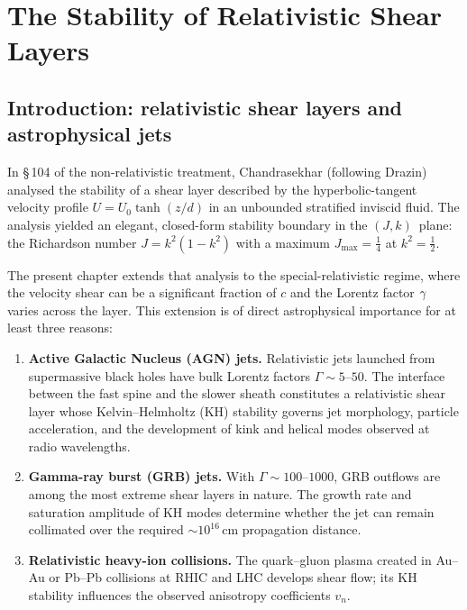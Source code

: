 
\chapter{The Stability of Relativistic Shear Layers}
\label{ch:rel-11-104}

\section{Introduction: relativistic shear layers and astrophysical jets}
\label{sec:rel-11-104-intro}

In \S\,104 of the non-relativistic treatment, Chandrasekhar (following
Drazin) analysed the stability of a shear layer described by the
hyperbolic-tangent velocity profile $U=U_0\tanh(z/d)$ in an unbounded
stratified inviscid fluid.  The analysis yielded an elegant, closed-form
stability boundary in the $(J,k)$~plane: the Richardson number
$J=k^2(1-k^2)$ with a maximum $J_{\max}=\tfrac{1}{4}$ at $k^2=\tfrac{1}{2}$.

The present chapter extends that analysis to the special-relativistic
regime, where the velocity shear can be a significant fraction of $c$ and
the Lorentz factor $\gamma$ varies across the layer.  This extension is of
direct astrophysical importance for at least three reasons:
\begin{enumerate}
\item \textbf{Active Galactic Nucleus (AGN) jets.}  Relativistic jets
  launched from supermassive black holes have bulk Lorentz factors
  $\Gamma\sim 5$--$50$.  The interface between the fast spine and the
  slower sheath constitutes a relativistic shear layer whose
  Kelvin--Helmholtz (KH) stability governs jet morphology, particle
  acceleration, and the development of kink and helical modes observed
  at radio wavelengths.
\item \textbf{Gamma-ray burst (GRB) jets.}  With $\Gamma\sim 100$--$1000$,
  GRB outflows are among the most extreme shear layers in nature.  The
  growth rate and saturation amplitude of KH modes determine whether
  the jet can remain collimated over the required $\sim 10^{16}\,$cm
  propagation distance.
\item \textbf{Relativistic heavy-ion collisions.}  The quark--gluon plasma
  created in Au--Au or Pb--Pb collisions at RHIC and LHC develops shear
  flow; its KH stability influences the observed anisotropy coefficients
  $v_n$.
\end{enumerate}

